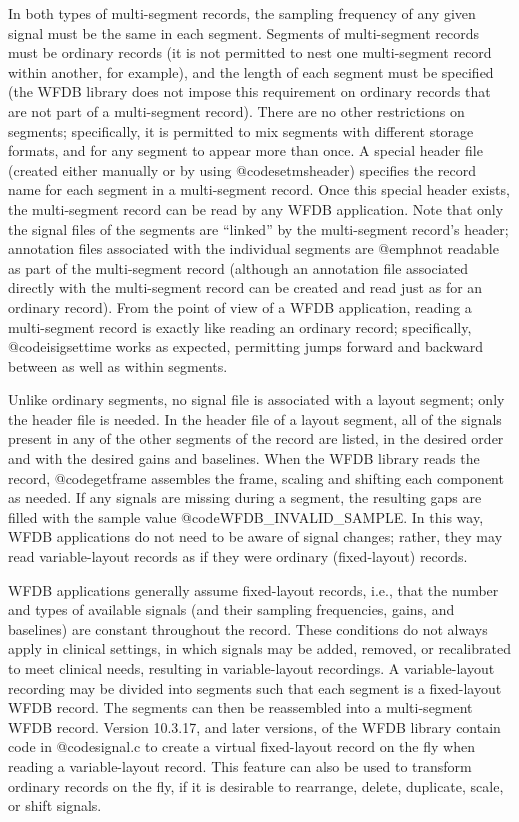 {{{{{{{{{{{{{{In both types of multi-segment records, the sampling frequency of any
given signal must be the same in each segment.  Segments of
multi-segment records must be ordinary records (it is not permitted to
nest one multi-segment record within another, for example), and the
length of each segment must be specified (the WFDB library does not
impose this requirement on ordinary records that are not part of a
multi-segment record).  There are no other restrictions on segments;
specifically, it is permitted to mix segments with different storage
formats, and for any segment to appear more than once.  A special
header file (created either manually or by using @code{setmsheader})
specifies the record name for each segment in a multi-segment record.
Once this special header exists, the multi-segment record can be read
by any WFDB application.  Note that only the signal files of the
segments are ``linked'' by the multi-segment record's header;
annotation files associated with the individual segments are
@emph{not} readable as part of the multi-segment record (although an
annotation file associated directly with the multi-segment record can
be created and read just as for an ordinary record).  From the point
of view of a WFDB application, reading a multi-segment record is
exactly like reading an ordinary record; specifically,
@code{isigsettime} works as expected, permitting jumps forward and
backward between as well as within segments.

Unlike ordinary segments, no signal file is associated with a layout segment;
only the header file is needed.  In the header file of a layout segment, all of
the signals present in any of the other segments of the record are listed, in
the desired order and with the desired gains and baselines.  When the WFDB
library reads the record, @code{getframe} assembles the frame, scaling and
shifting each component as needed.  If any signals are missing during a
segment, the resulting gaps are filled with the sample value
@code{WFDB_INVALID_SAMPLE}.  In this way, WFDB applications do not need to be
aware of signal changes; rather, they may read variable-layout records as if
they were ordinary (fixed-layout) records.

WFDB applications generally assume fixed-layout records, i.e., that
the number and types of available signals (and their sampling
frequencies, gains, and baselines) are constant throughout the record.
These conditions do not always apply in clinical settings, in which
signals may be added, removed, or recalibrated to meet clinical needs,
resulting in variable-layout recordings.  A variable-layout recording
may be divided into segments such that each segment is a fixed-layout
WFDB record.  The segments can then be reassembled into a
multi-segment WFDB record.  Version 10.3.17, and later versions, of
the WFDB library contain code in @code{signal.c} to create a virtual
fixed-layout record on the fly when reading a variable-layout record.
This feature can also be used to transform ordinary records on the fly, if
it is desirable to rearrange, delete, duplicate, scale, or shift
signals.

}}}}}}}}}}}}}}
